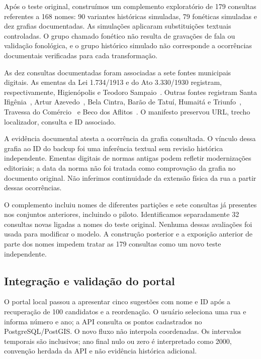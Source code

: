 Após o teste original, construímos um complemento exploratório de 179 consultas referentes a 168 nomes: 90 variantes históricas simuladas, 79 fonéticas simuladas e dez grafias documentadas. As simulações aplicaram substituições textuais controladas. O grupo chamado fonético não resulta de gravações de fala ou validação fonológica, e o grupo histórico simulado não corresponde a ocorrências documentais verificadas para cada transformação.

As dez consultas documentadas foram associadas a sete fontes municipais digitais. As ementas da Lei 1.734/1913 e do Ato 3.330/1930 registram, respectivamente, Higienópolis e Teodoro Sampaio~\cite{lei1734,ato3330}. Outras fontes registram Santa Ifigênia~\cite{santaIfigenia}, Artur Azevedo~\cite{conpresp7}, Bela Cintra, Barão de Tatuí, Humaitá e Triunfo~\cite{smsub40}, Travessa do Comércio~\cite{lei1552} e Beco dos Aflitos~\cite{aflitos}. O manifesto preservou URL, trecho localizador, consulta e ID associado.

A evidência documental atesta a ocorrência da grafia consultada. O vínculo dessa grafia ao ID do backup foi uma inferência textual sem revisão histórica independente. Ementas digitais de normas antigas podem refletir modernizações editoriais; a data da norma não foi tratada como comprovação da grafia no documento original. Não inferimos continuidade da extensão física da rua a partir dessas ocorrências.

O complemento incluiu nomes de diferentes partições e sete consultas já presentes nos conjuntos anteriores, incluindo o piloto. Identificamos separadamente 32 consultas novas ligadas a nomes do teste original. Nenhuma dessas avaliações foi usada para modificar o modelo. A construção posterior e a exposição anterior de parte dos nomes impedem tratar as 179 consultas como um novo teste independente.

\subsection{Integração e validação do portal}

O portal local passou a apresentar cinco sugestões com nome e ID após a recuperação de 100 candidatos e a reordenação. O usuário seleciona uma rua e informa número e ano; a API consulta os pontos cadastrados no PostgreSQL/PostGIS. O novo fluxo não interpola coordenadas. Os intervalos temporais são inclusivos; ano final nulo ou zero é interpretado como 2000, convenção herdada da API e não evidência histórica adicional.

